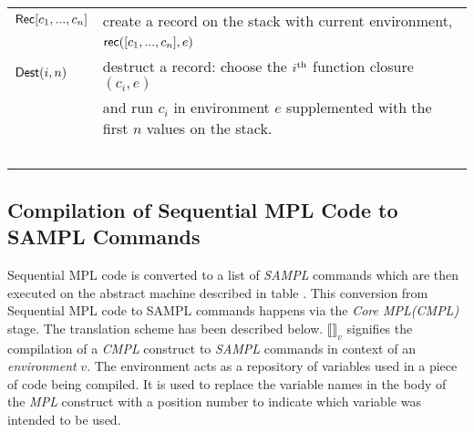 \documentclass[11pt]{article}
\newcommand{\<}{\langle}
\renewcommand{\>}{\rangle}
\begin{document}
\begin{center}
\begin{tabular}{|l|l|}
  ${\sf Rec}[c_1,...,c_n]$      &         create a record on the stack with current environment, \\
                                            & ${\sf rec}([c_1,...,c_n],e)$  \\
 ${\sf Dest}(i,n)$ &             destruct a record: choose the $i^{\rm th}$  function closure $(c_i,e)$  \\
                        &  and run $c_i$ in environment $e$ supplemented with the first $n$ values on the stack. \\
~ & ~ \\ \hline
\end{tabular}
\end{center}

\subsection {Compilation of Sequential MPL Code to SAMPL Commands}
Sequential MPL code is converted to a list of {\em SAMPL} commands which are then executed on the abstract machine described in table . This conversion from Sequential MPL code to SAMPL commands happens via the {\em Core MPL(CMPL)} stage. The translation scheme has been described below. ${\llbracket \rrbracket}_v$ signifies the compilation of a {\em CMPL} construct to {\em SAMPL} commands in context of an {\em environment} $v$. The environment acts as a repository of variables used in a piece of code being compiled. It is used to replace the variable names in the body of the {\em MPL} construct with a position number to indicate which variable was intended to be used.
\end{document}
